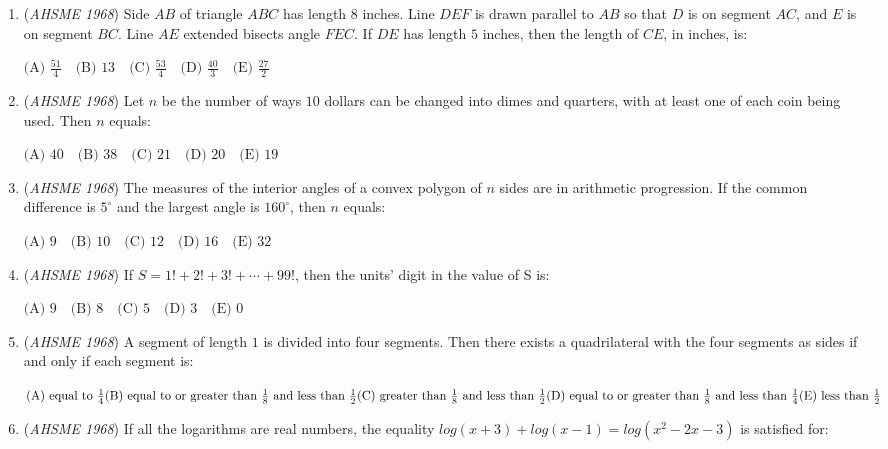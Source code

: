 \begin{enumerate}
	\item (\textit{AHSME 1968}) Side $AB$ of triangle $ABC$ has length 8 inches. Line $DEF$ is drawn parallel to $AB$ so that $D$ is on segment $AC$, and $E$ is on segment $BC$. Line $AE$ extended bisects angle $FEC$. If $DE$ has length $5$ inches, then the length of $CE$, in inches, is:


 $\text{(A) } \frac{51}{4}\quad \text{(B) } 13\quad \text{(C) } \frac{53}{4}\quad \text{(D) } \frac{40}{3}\quad \text{(E) } \frac{27}{2}$


	\item (\textit{AHSME 1968}) Let $n$ be the number of ways $10$ dollars can be changed into dimes and quarters, with at least one of each coin being used. Then $n$ equals:


 $\text{(A) } 40\quad \text{(B) } 38\quad \text{(C) } 21\quad \text{(D) } 20\quad \text{(E) } 19$


	\item (\textit{AHSME 1968}) The measures of the interior angles of a convex polygon of $n$ sides are in arithmetic progression. If the common difference is $5^{\circ}$ and the largest angle is $160^{\circ}$, then $n$ equals:


 $\text{(A) } 9\quad \text{(B) } 10\quad \text{(C) } 12\quad \text{(D) } 16\quad \text{(E) } 32$


	\item (\textit{AHSME 1968}) If $S=1!+2!+3!+\cdots +99!$, then the units' digit in the value of S is:


 $\text{(A) } 9\quad \text{(B) } 8\quad \text{(C) } 5\quad \text{(D) } 3\quad \text{(E) } 0$


	\item (\textit{AHSME 1968}) A segment of length $1$ is divided into four segments. Then there exists a quadrilateral with the four segments as sides if and only if each segment is:


 $\text{(A) equal to } \frac{1}{4}\quad\\ \text{(B) equal to or greater than } \frac{1}{8} \text{ and less than }\frac{1}{2}\quad\\ \text{(C) greater than } \frac{1}{8} \text{ and less than }\frac{1}{2}\quad\\ \text{(D) equal to or greater than } \frac{1}{8} \text{ and less than }\frac{1}{4}\quad\\ \text{(E) less than }\frac{1}{2}$


	\item (\textit{AHSME 1968}) If all the logarithms are real numbers, the equality
$log(x+3)+log(x-1)=log(x^2-2x-3)$
is satisfied for:



\end{enumerate}
